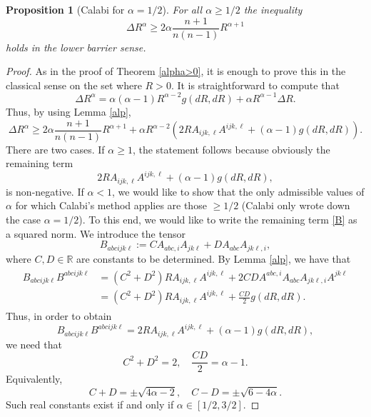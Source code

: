 \documentclass[11pt,reqno]{amsart}
\newcommand{\R}{\mathbb{R}}
\renewcommand{\geq}{\geqslant}
\theoremstyle{plain}
\newtheorem{proposition}[theorem]{Proposition}
\theoremstyle{definition}
\numberwithin{equation}{section}
\begin{document}
\begin{proposition}[Calabi {\cite[Eq. 2.15]{EC}} for $\alpha=1/2$]\label{prop:DiffIneqR}
For all $\alpha \geq 1/2$ the inequality
\begin{equation}\label{LE}
\Delta R^{\alpha} \geq 2\alpha\frac{n+1}{n(n-1)} R^{\alpha+1}
\end{equation}
holds in the lower barrier sense.
\end{proposition}

\begin{proof}
As in the proof of Theorem \ref{alpha>0}, it is enough to prove this in the classical sense on the set where $R > 0$. It is straightforward to compute that
$$\Delta R^\alpha = \alpha(\alpha-1)R^{\alpha-2}g(d R,d R)+\alpha R^{\alpha-1}\Delta R.$$
Thus, by using Lemma \ref{alp},
$$\Delta R^\alpha\geq 2\alpha\frac{n+1}{n(n-1)}R^{\alpha+1}+\alpha R^{\alpha-2}(2R  A_{ijk,\ell}A^{ijk,\ell}+(\alpha-1)g(d R,d R)).$$
There are two cases. If $\alpha\geq1$, the statement follows because obviously the remaining term
\begin{equation}\label{B}
2R  A_{ijk,\ell}A^{ijk,\ell}+(\alpha-1)g(d R,d R),
\end{equation}
is non-negative. If $\alpha<1$, we would like to show that the only admissible values of $\alpha$ for which Calabi's method applies are those $\geq 1/2$ (Calabi \cite{EC} only wrote down the case $\alpha = 1/2$). To this end, we would like to write the remaining term \eqref{B} as a squared norm. We introduce the tensor
$$B_{abcijk\ell}:=CA_{abc,i}A_{jk\ell}+DA_{abc}A_{jk\ell,i},$$
where $C,D\in\R$ are constants to be determined. By Lemma \ref{alp}, we have that
\begin{align*}\begin{split}
     B_{abcijk\ell}B^{abcijk\ell} & = \displaystyle (C^2+D^2)RA_{ijk,\ell}A^{ijk,\ell}+2CDA^{abc,i}A_{abc}A_{jk\ell,i}A^{jk\ell} \\
     & = \displaystyle  (C^2+D^2)RA_{ijk,\ell}A^{ijk,\ell}+\frac{CD}{2}g(d R,d R).
\end{split}\end{align*}
Thus, in order to obtain
$$
    B_{abcijk\ell}B^{abcijk\ell}=2R  A_{ijk,\ell}A^{ijk,\ell}+(\alpha-1)g(d R,d R),
$$
we need that
$$C^2+D^2=2,\quad  \frac{CD}{2}=\alpha-1.$$ 
Equivalently,
$$C+D=\pm\sqrt{4\alpha-2},\quad  C-D=\pm\sqrt{6-4\alpha}.$$
Such real constants exist if and only if $\alpha\in[1/2,3/2]$.
\end{proof}
\end{document}
